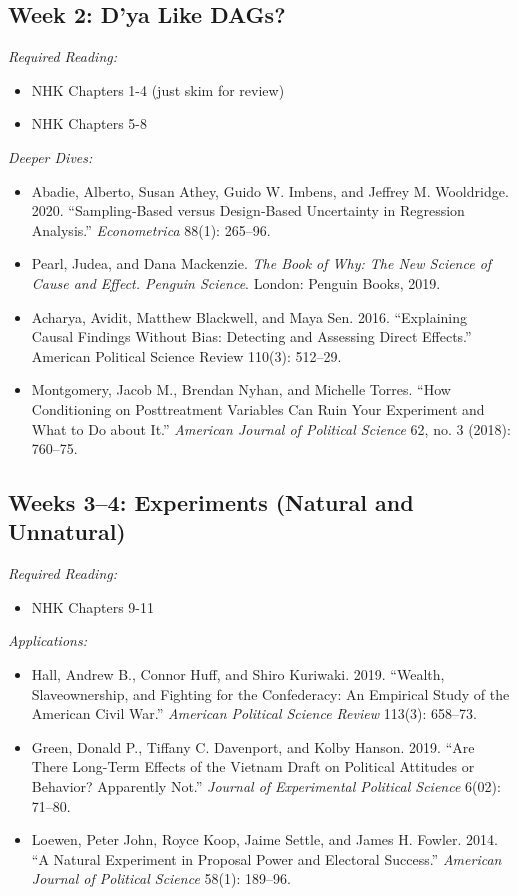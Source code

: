 \documentclass[11pt, letterpaper]{article}
\begin{document}
\subsection*{Week 2: D'ya Like DAGs?}

\textit{Required Reading:}

\begin{itemize}
	\item NHK Chapters 1-4 (just skim for review)
	\item NHK Chapters 5-8
\end{itemize}

\noindent \textit{Deeper Dives:}

\begin{itemize}
	\item Abadie, Alberto, Susan Athey, Guido W. Imbens, and Jeffrey M. Wooldridge. 2020. ``Sampling‐Based versus Design‐Based Uncertainty in Regression Analysis.'' \textit{Econometrica} 88(1): 265–96.
	\item Pearl, Judea, and Dana Mackenzie. \textit{The Book of Why: The New Science of Cause and Effect. Penguin Science}. London: Penguin Books, 2019.
	\item Acharya, Avidit, Matthew Blackwell, and Maya Sen. 2016. ``Explaining Causal Findings Without Bias: Detecting and Assessing Direct Effects.'' American Political Science Review 110(3): 512–29.
	\item Montgomery, Jacob M., Brendan Nyhan, and Michelle Torres. ``How Conditioning on Posttreatment Variables Can Ruin Your Experiment and What to Do about It.'' \textit{American Journal of Political Science} 62, no. 3 (2018): 760–75.
\end{itemize}

\subsection*{Weeks 3--4: Experiments (Natural and Unnatural)}

\textit{Required Reading:}

\begin{itemize}
	\item NHK Chapters 9-11

\end{itemize}

\noindent \textit{Applications:}

\begin{itemize}
	\item Hall, Andrew B., Connor Huff, and Shiro Kuriwaki. 2019. ``Wealth, Slaveownership, and Fighting for the Confederacy: An Empirical Study of the American Civil War.'' \textit{American Political Science Review} 113(3): 658–73.
	\item Green, Donald P., Tiffany C. Davenport, and Kolby Hanson. 2019. ``Are There Long-Term Effects of the Vietnam Draft on Political Attitudes or Behavior? Apparently Not.'' \textit{Journal of Experimental Political Science} 6(02): 71–80.
	\item Loewen, Peter John, Royce Koop, Jaime Settle, and James H. Fowler. 2014. “A Natural Experiment in Proposal Power and Electoral Success.” \textit{American Journal of Political Science} 58(1): 189–96.
\end{itemize}
\end{document}
